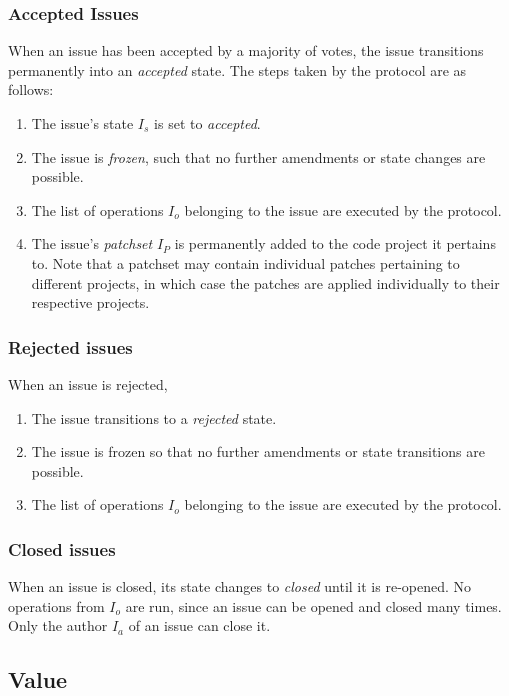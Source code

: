 
\subsubsection{Accepted Issues} When an issue has been accepted by a majority
of votes, the issue transitions permanently into an \emph{accepted} state. The
steps taken by the protocol are as follows:

\begin{enumerate}
    \item The issue's state $I_s$ is set to \emph{accepted}.
    \item The issue is \emph{frozen}, such that no further amendments or state
        changes are possible.
    \item The list of operations $I_o$ belonging to the issue are executed by
        the protocol.
    \item The issue's \emph{patchset} $I_P$ is permanently added to the code
        project it pertains to. Note that a patchset may contain individual
        patches pertaining to different projects, in which case the patches are
        applied individually to their respective projects.
\end{enumerate}

\subsubsection{Rejected issues} When an issue is rejected,
\begin{enumerate}
    \item The issue transitions to a \emph{rejected} state.
    \item The issue is frozen so that no further amendments or state
        transitions are possible.
    \item The list of operations $I_o$ belonging to the issue are executed by
        the protocol.
\end{enumerate}

\subsubsection{Closed issues} When an issue is closed, its state changes to
\emph{closed} until it is re-opened. No operations from $I_o$ are run, since
an issue can be opened and closed many times. Only the author $I_a$ of an issue
can close it.

\subsection{Value}

